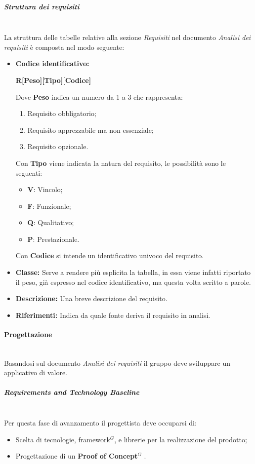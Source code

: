 \subparagraph{Struttura dei requisiti}
\mbox{} \\
La struttura delle tabelle relative alla sezione \textit{Requisiti} nel documento \textit{Analisi dei requisiti} è composta nel modo seguente:
\begin{itemize}
    \item   \textbf{Codice identificativo:}
            \par \centerline{\textbf{R[Peso][Tipo][Codice]}}
            Dove \textbf{Peso} indica un numero da 1 a 3 che rappresenta:
            \begin{enumerate}
                \item Requisito obbligatorio;
                \item Requisito apprezzabile ma non essenziale;
                \item Requisito opzionale.
            \end{enumerate}
            Con \textbf{Tipo} viene indicata la natura del requisito, le possibilità sono le seguenti:
            \begin{itemize}
                \item \textbf{V}: Vincolo;
                \item \textbf{F}: Funzionale;
                \item \textbf{Q}: Qualitativo;
                \item \textbf{P}: Prestazionale.
            \end{itemize}
            Con \textbf{Codice} si intende un identificativo univoco del requisito.
    \item \textbf{Classe:} Serve a rendere più esplicita la tabella, in essa viene infatti riportato il peso, già espresso nel codice identificativo, ma questa volta scritto a parole.
    \item \textbf{Descrizione:} Una breve descrizione del requisito.
    \item \textbf{Riferimenti:} Indica da quale fonte deriva il requisito in analisi.
\end{itemize}

\paragraph{Progettazione}
\mbox{} \\
Basandosi sul documento \textit{Analisi dei requisiti} il gruppo deve sviluppare
un applicativo di valore.

\subparagraph{Requirements and Technology Baseline}
\mbox{} \\
Per questa fase di avanzamento il progettista deve occuparsi di:
\begin{itemize}
    \item Scelta di tecnologie, framework$^G$, e librerie per la realizzazione del prodotto;
    \item Progettazione di un \textbf{Proof of Concept}$^G$ .
\end{itemize}

